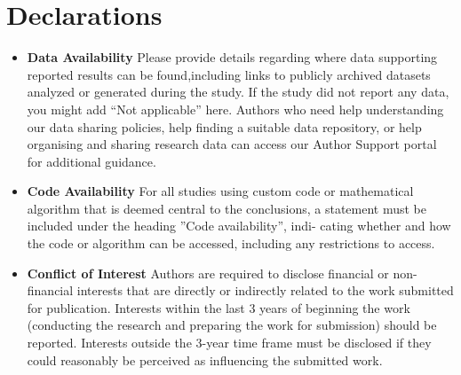 \documentclass[12pt]{sn-jnl}%
\theoremstyle{thmstyleone}%
\theoremstyle{thmstyletwo}%
\theoremstyle{thmstylethree}%
\begin{document}
\section*{Declarations}
\begin{itemize}
\item \textbf{Data Availability}
Please provide details regarding where data supporting reported results can be found,including links to publicly archived datasets analyzed or generated during the study. If the study did not report any data, you might add “Not applicable” here. Authors who need help understanding our data sharing policies, help finding a suitable data repository, or help organising and sharing research data can access our Author Support portal for
additional guidance.
\item \textbf{Code Availability}
For all studies using custom code or mathematical algorithm that is deemed central to the
conclusions, a statement must be included under the heading ”Code availability”, indi-
cating whether and how the code or algorithm can be accessed, including any restrictions
to access.

\item \textbf{Conflict of Interest}
Authors are required to disclose financial or non-financial interests that are directly or
indirectly related to the work submitted for publication. Interests within the last 3 years
of beginning the work (conducting the research and preparing the work for submission)
should be reported. Interests outside the 3-year time frame must be disclosed if they could
reasonably be perceived as influencing the submitted work.



\end{itemize}
\end{document}
